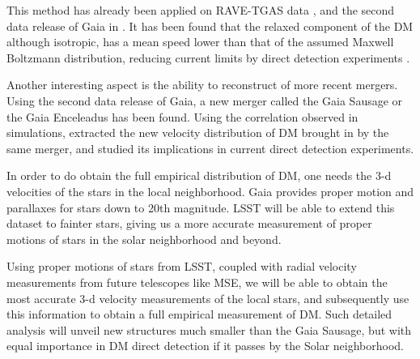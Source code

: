 This method has already been applied on RAVE-TGAS data \citep{Herzog-Arbeitman:2017zbm}, and the second data release of Gaia in \cite{necib2018}. It has been found that the relaxed component of the DM although isotropic, has a mean speed lower than that of the assumed Maxwell Boltzmann distribution, reducing current limits by direct detection experiments \citep{Aprile:2018dbl}.

Another interesting aspect is the ability to reconstruct of more recent mergers. Using the second data release of Gaia, a new merger called the Gaia Sausage or the Gaia Enceleadus \citep{2018MNRAS.477.1472B,2018Natur.563...85H} has been found. Using the correlation observed in simulations, \cite{necib2018} extracted the new velocity distribution of DM brought in by the same merger, and studied its implications in current direct detection experiments. 

In order to do obtain the full empirical distribution of DM, one needs the 3-d velocities of the stars in the local neighborhood. Gaia provides proper motion and parallaxes for stars down to 20th magnitude. LSST will be able to extend this dataset to fainter stars, giving us a more accurate measurement of proper motions of stars in the solar neighborhood and beyond.

 Using proper motions of stars from LSST, coupled with radial velocity measurements from future telescopes like MSE, we will be able to obtain the most accurate 3-d velocity measurements of the local stars, and subsequently use this information to obtain a full empirical measurement of DM. Such detailed analysis will unveil new structures much smaller than the Gaia Sausage, but with equal importance in DM direct detection if it passes by the Solar neighborhood.

